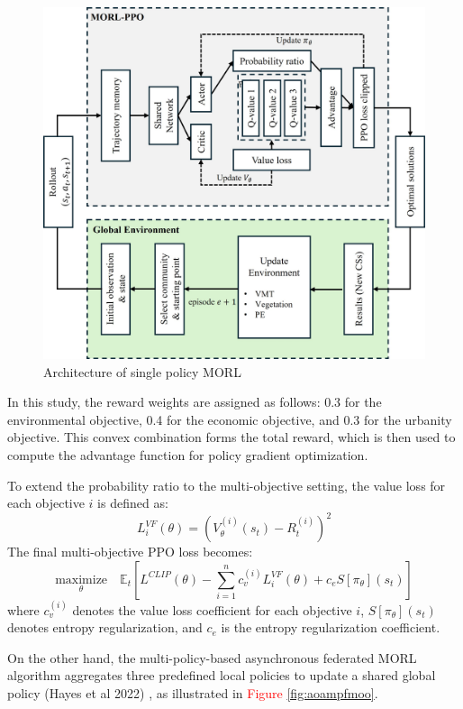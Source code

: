 \documentclass[preprint,12pt]{elsarticle}
\begin{document}
\begin{figure}[h]
    \centering
    \includegraphics[width=0.7\linewidth]{paper/doc/result_figure/MORL PPO_v2.jpg}
    \caption{Architecture of single policy MORL}
    \label{fig:aospmorl}
\end{figure}
In this study, the reward weights are assigned as follows: 0.3 for the environmental objective, 0.4 for the economic objective, and 0.3 for the urbanity objective. This convex combination forms the total reward, which is then used to compute the advantage function for policy gradient optimization.

To extend the probability ratio to the multi-objective setting, the value loss for each objective $i$ is defined as:
\begin{equation}
    L^{VF}_i(\theta) = \left( V_\theta^{(i)}(s_t) - R_t^{(i)} \right)^2
\end{equation}
The final multi-objective PPO loss becomes:
\begin{equation}
    \underset{\theta}{\text{maximize}} \quad 
    \mathbb{E}_t \left[
L^{CLIP}(\theta)
- \sum_{i=1}^{n} c_{v}^{(i)} L^{VF}_i(\theta)
+ c_e S[\pi_\theta](s_t)
\right]
\end{equation}
where $c_v^{(i)}$ denotes the value loss coefficient for each objective $i$, $S[\pi_\theta](s_t)$ denotes entropy regularization, and $c_e$ is the entropy regularization coefficient.

On the other hand, the multi-policy-based asynchronous federated MORL algorithm aggregates three predefined local policies to update a shared global policy (Hayes et al 2022) \cite{Hayes2022}, as illustrated in \textcolor{red}{Figure} \ref{fig:aoampfmoo}.
\end{document}
